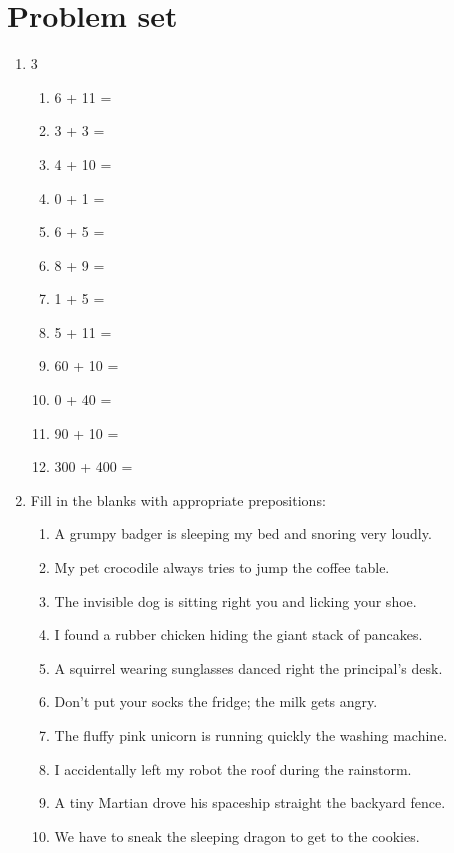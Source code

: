 \documentclass{tufte-book}
\begin{document}
\clearpage\section{Problem set }

\begin{enumerate}

  \item
  \begin{multicols}{3}
    \begin{enumerate}\bigskip
      \item 6 + 11 = \dotfill\bigskip
      \item 3 + 3 = \dotfill\bigskip
      \item 4 + 10 = \dotfill\bigskip
      \item 0 + 1 = \dotfill
      \item 6 + 5 = \dotfill\bigskip
      \item 8 + 9 = \dotfill\bigskip
      \item 1 + 5 = \dotfill\bigskip
      \item 5 + 11 = \dotfill
      \item 60 + 10 = \dotfill\bigskip
      \item 0 + 40 = \dotfill\bigskip
      \item 90 + 10 = \dotfill\bigskip
      \item 300 + 400 = \dotfill\bigskip
    \end{enumerate}
  \end{multicols}

  \item Fill in the blanks with appropriate prepositions:
  \begin{enumerate}\bigskip
      \item A grumpy badger is sleeping \makebox[3cm][s]{\dotfill} my bed and snoring very loudly.
      \item My pet crocodile always tries to jump \makebox[3cm][s]{\dotfill} the coffee table.
      \item The invisible dog is sitting right \makebox[3cm][s]{\dotfill} you and licking your shoe.
      \item I found a rubber chicken hiding \makebox[3cm][s]{\dotfill} the giant stack of pancakes.
      \item A squirrel wearing sunglasses danced right \makebox[3cm][s]{\dotfill} the principal's desk.
      \item Don't put your socks \makebox[3cm][s]{\dotfill} the fridge; the milk gets angry.
      \item The fluffy pink unicorn is running quickly \makebox[3cm][s]{\dotfill} the washing machine.
      \item I accidentally left my robot \makebox[3cm][s]{\dotfill} the roof during the rainstorm.
      \item A tiny Martian drove his spaceship straight \makebox[3cm][s]{\dotfill} the backyard fence.
      \item We have to sneak \makebox[3cm][s]{\dotfill} the sleeping dragon to get to the cookies.
  \end{enumerate}
  

\end{enumerate}
\end{document}

